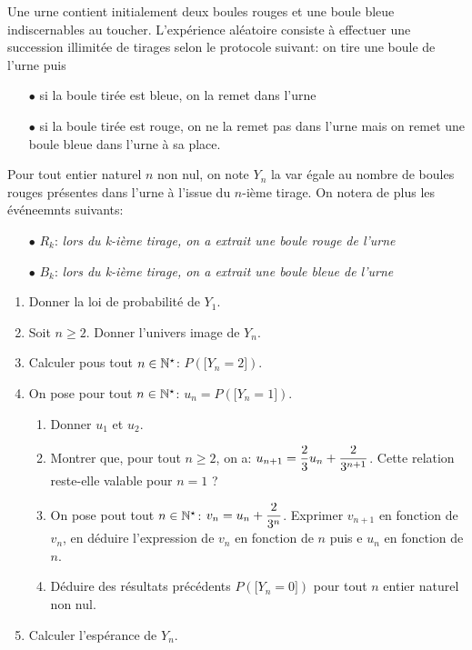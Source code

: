\documentclass[a4paper, 11pt,reqno]{article}
\begin{document}
\begin{correction}
	Une urne contient initialement deux boules rouges et une boule bleue indiscernables au toucher. L'exp\'erience al\'eatoire consiste \`a effectuer une succession illimit\'ee de tirages selon le protocole suivant: on tire une boule de l'urne puis
	\begin{itemize}
		\item[$\bullet$] si la boule tir\'ee est bleue, on la remet dans l'urne
		\item[$\bullet$]  si la boule tir\'ee est rouge, on ne la remet pas dans l'urne mais on remet une boule bleue dans l'urne \`a sa place.
	\end{itemize}
	Pour tout entier naturel $n$ non nul, on note $Y_n$ la var \'egale au nombre de boules rouges pr\'esentes dans l'urne \`a l'issue du $n$-i\`eme tirage. On notera de plus les \'ev\'eneemnts suivants:
	\begin{itemize}
		\item[$\bullet$] $R_k$: \textit{lors du k-i\`eme tirage, on a extrait une boule rouge de l'urne}
		\item[$\bullet$] $B_k$: \textit{lors du k-i\`eme tirage, on a extrait une boule bleue de l'urne}
	\end{itemize}
	\begin{enumerate}
		\item Donner la loi de probabilit\'e de $Y_1$.
		\item Soit $n\geq 2$. Donner l'univers image de $Y_n$.
		\item Calculer pous tout $n\in\mathbb{N}^{\star}$: $P(\lbrack Y_n=2\rbrack)$.
		\item On pose pour tout $n\in\mathbb{N}^{\star}$: $u_n=P(\lbrack Y_n=1\rbrack)$.
		      \begin{enumerate}
			      \item Donner $u_1$ et $u_2$.
			      \item Montrer que, pour tout $n\geq 2$, on a: $u_{n+1}=\displaystyle\frac{2}{3}u_n+\displaystyle\frac{2}{3^{n+1}}$. Cette relation reste-elle valable pour $n=1$ ?
			      \item On pose pout tout $n\in\mathbb{N}^{\star}$: $v_n=u_n+\displaystyle\frac{2}{3^n}$. Exprimer $v_{n+1}$ en fonction de $v_n$, en d\'eduire l'expression de $v_n$ en fonction de $n$ puis e $u_n$ en fonction de $n$.
			      \item D\'eduire des r\'esultats pr\'ec\'edents $P(\lbrack Y_n=0\rbrack)$ pour tout $n$ entier naturel non nul.
		      \end{enumerate}
		\item Calculer l'esp\'erance de $Y_n$.

\end{enumerate}
\end{correction}
\end{document}
